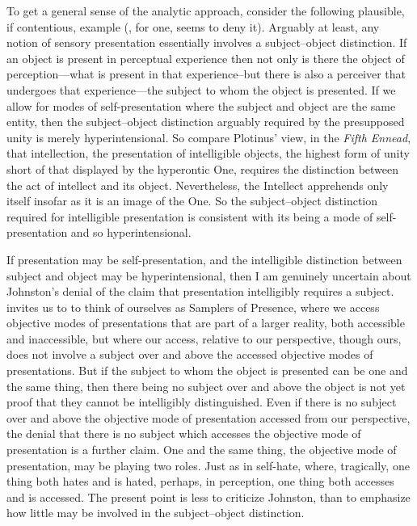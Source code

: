 To get a general sense of the analytic approach, consider the following plausible, if contentious, example (\citealt{Johnston:2007qy}, for one, seems to deny it). Arguably at least, any notion of sensory presentation essentially involves a subject--object distinction. If an object is present in perceptual experience then not only is there the object of perception---what is present in that experience--but there is also a perceiver that undergoes that experience---the subject to whom the object is presented. If we allow for modes of self-presentation where the subject and object are the same entity, then the subject--object distinction arguably required by the presupposed unity is merely hyperintensional. So compare Plotinus' view, in the \emph{Fifth Ennead}, that intellection, the presentation of intelligible objects, the highest form of unity short of that displayed by the hyperontic One, requires the distinction between the act of intellect and its object. Nevertheless, the Intellect apprehends only itself insofar as it is an image of the One. So the subject--object distinction required for intelligible presentation is consistent with its being a mode of self-presentation and so hyperintensional. 

If presentation may be self-presentation, and the intelligible distinction between subject and object may be hyperintensional, then I am genuinely uncertain about Johnston's denial of the claim that presentation intelligibly requires a subject. \citet{Johnston:2007qy} invites us to to think of ourselves as Samplers of Presence, where we access objective modes of presentations that are part of a larger reality, both accessible and inaccessible, but where our access, relative to our perspective, though ours, does not involve a subject over and above the accessed objective modes of presentations. But if the subject to whom the object is presented can be one and the same thing, then there being no subject over and above the object is not yet proof that they cannot be intelligibly distinguished. Even if there is no subject over and above the objective mode of presentation accessed from our perspective, the denial that there is no subject which accesses the objective mode of presentation is a further claim. One and the same thing, the objective mode of presentation, may be playing two roles. Just as in self-hate, where, tragically, one thing both hates and is hated, perhaps, in perception, one thing both accesses and is accessed. The present point is less to criticize Johnston, than to emphasize how little may be involved in the subject--object distinction.

